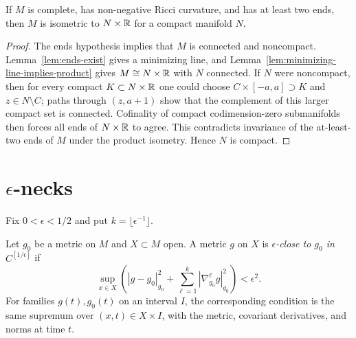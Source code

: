 \begin{theorem}
\label{thm:splitting-theorem}
\label{splitting}


If $M$ is complete, has non-negative Ricci curvature, and has at least
two ends, then $M$ is isometric to $N\times\mathbb{R}$ for a compact manifold
$N$.
\end{theorem}
\begin{proof}
\sketch
{}
The ends hypothesis implies that $M$ is connected and noncompact.
Lemma~\ref{lem:ends-exist} gives a minimizing line, and
Lemma~\ref{lem:minimizing-line-implies-product} gives
$M\cong N\times\mathbb{R}$ with $N$ connected. If $N$ were noncompact, then
for every compact $K\subset N\times\mathbb{R}$ one could choose
$C\times[-a,a]\supset K$ and $z\in N\setminus C$; paths through
$(z,a+1)$ show that the complement of this larger compact set is
connected. Cofinality of compact codimension-zero submanifolds then
forces all ends of $N\times\mathbb{R}$ to agree. This contradicts invariance of
the at-least-two ends of $M$ under the product isometry. Hence $N$ is
compact.
\end{proof}

\section{$\epsilon$-necks}

Fix $0<\epsilon<1/2$ and put $k=\lfloor\epsilon^{-1}\rfloor$.

\begin{definition}
\label{def:epsilon-close-topology}


\label{epsclose}

Let $g_0$ be a metric on $M$ and $X\subset M$ open. A metric $g$ on
$X$ is \emph{$\epsilon$-close to $g_0$ in $C^{[1/\epsilon]}$} if
\begin{equation}\label{eqnepsclose}
\sup_{x\in X}\left(|g-g_0|_{g_0}^2
+\sum_{\ell=1}^k|\nabla_{g_0}^\ell g|_{g_0}^2\right)<\epsilon^2.
\end{equation}
For families $g(t),g_0(t)$ on an interval $I$, the corresponding
condition is the same supremum over $(x,t)\in X\times I$, with the
metric, covariant derivatives, and norms at time $t$.
\end{definition}

